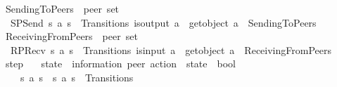 \begin{isabellebody}
\isanewline
{}\isamarkupfalse%
\ SendingToPeers\ {\isacharcolon}{\kern0pt}{\isacharcolon}{\kern0pt}\ {\isachardoublequoteopen}{\isacharprime}{\kern0pt}peer\ set{\isachardoublequoteclose}\ \isanewline
\ \ SPSend{\isacharcolon}{\kern0pt}\ {\isachardoublequoteopen}{\isasymlbrakk}{\isacharparenleft}{\kern0pt}s{}{\isacharcomma}{\kern0pt}\ a{\isacharcomma}{\kern0pt}\ s{}{\isacharparenright}{\kern0pt}\ {\isasymin}\ Transitions{\isacharsemicolon}{\kern0pt}\ is{\isacharunderscore}{\kern0pt}output\ a{\isasymrbrakk}\ {\isasymLongrightarrow}\ get{\isacharunderscore}{\kern0pt}object\ a\ {\isasymin}\ SendingToPeers{\isachardoublequoteclose}\isanewline
\isanewline
{}\isamarkupfalse%
\ ReceivingFromPeers\ {\isacharcolon}{\kern0pt}{\isacharcolon}{\kern0pt}\ {\isachardoublequoteopen}{\isacharprime}{\kern0pt}peer\ set{\isachardoublequoteclose}\ \isanewline
\ \ RPRecv{\isacharcolon}{\kern0pt}\ {\isachardoublequoteopen}{\isasymlbrakk}{\isacharparenleft}{\kern0pt}s{}{\isacharcomma}{\kern0pt}\ a{\isacharcomma}{\kern0pt}\ s{}{\isacharparenright}{\kern0pt}\ {\isasymin}\ Transitions{\isacharsemicolon}{\kern0pt}\ is{\isacharunderscore}{\kern0pt}input\ a{\isasymrbrakk}\ {\isasymLongrightarrow}\ get{\isacharunderscore}{\kern0pt}object\ a\ {\isasymin}\ ReceivingFromPeers{\isachardoublequoteclose}\isanewline
\isanewline
{}\isamarkupfalse%
\ step\isanewline
\ \ {\isacharcolon}{\kern0pt}{\isacharcolon}{\kern0pt}\ {\isachardoublequoteopen}{\isacharprime}{\kern0pt}state\ {\isasymRightarrow}\ {\isacharparenleft}{\kern0pt}{\isacharprime}{\kern0pt}information{\isacharcomma}{\kern0pt}\ {\isacharprime}{\kern0pt}peer{\isacharparenright}{\kern0pt}\ action\ {\isasymRightarrow}\ {\isacharprime}{\kern0pt}state\ {\isasymRightarrow}\ bool{\isachardoublequoteclose}\ \ {\isacharparenleft}{\kern0pt}{\isachardoublequoteopen}{\isacharunderscore}{\kern0pt}\ {\isasymmidarrow}{\isacharunderscore}{\kern0pt}{\isasymrightarrow}\isactrlsub {\isasymC}\ {\isacharunderscore}{\kern0pt}{\isachardoublequoteclose}\ {\isacharbrackleft}{\kern0pt}{}{}{\isacharcomma}{\kern0pt}\ {}{}{\isacharcomma}{\kern0pt}\ {}{}{\isacharbrackright}{\kern0pt}\ {}{}{}{\isacharparenright}{\kern0pt}\isanewline
\ \ \isanewline
\ \ \ \ {\isachardoublequoteopen}s{}\ {\isasymmidarrow}a{\isasymrightarrow}\isactrlsub {\isasymC}\ s{}\ {\isasymequiv}\ {\isacharparenleft}{\kern0pt}s{}{\isacharcomma}{\kern0pt}\ a{\isacharcomma}{\kern0pt}\ s{}{\isacharparenright}{\kern0pt}\ {\isasymin}\ Transitions{\isachardoublequoteclose}\isanewline

\end{isabellebody}
